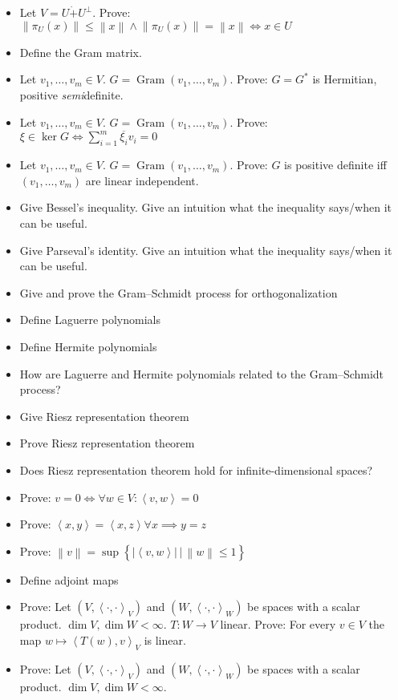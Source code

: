 \documentclass[a4paper]{article}
\newcommand{\setdef}[2]{\left\{\left.#1\,\right|\,#2\right\}}
\newcommand{\ip}[2]{\left\langle#1,#2\right\rangle} %
\newcommand{\norm}[1]{\left\|#1\right\|}
\newcommand{\card}[1]{\left|#1\right|}
\begin{document}
\begin{itemize}
  \item Let $V = U \dot+ U^{\bot}$. Prove: $\norm{\pi_U(x)} \leq \norm{x} \land \norm{\pi_U(x)} = \norm{x} \iff x \in U$
  \item Define the Gram matrix.
  \item Let $v_1, \ldots, v_m \in V$. $G = \operatorname{Gram}(v_1, \ldots, v_m)$. Prove: $G = G^*$ is Hermitian, positive \emph{semi}definite.
  \item Let $v_1, \ldots, v_m \in V$. $G = \operatorname{Gram}(v_1, \ldots, v_m)$. Prove: $\xi \in \ker{G} \iff \sum_{i=1}^m \overline{\xi_i} v_i = 0$
  \item Let $v_1, \ldots, v_m \in V$. $G = \operatorname{Gram}(v_1, \ldots, v_m)$. Prove: $G$ is positive definite iff $(v_1, \ldots, v_m)$ are linear independent.
  \item Give Bessel's inequality. Give an intuition what the inequality says/when it can be useful.
  \item Give Parseval's identity. Give an intuition what the inequality says/when it can be useful.
  \item Give and prove the Gram--Schmidt process for orthogonalization
  \item Define Laguerre polynomials
  \item Define Hermite polynomials
  \item How are Laguerre and Hermite polynomials related to the Gram--Schmidt process?
  \item Give Riesz representation theorem
  \item Prove Riesz representation theorem
  \item Does Riesz representation theorem hold for infinite-dimensional spaces?
  \item Prove: $v = 0 \iff \forall w \in V: \ip vw = 0$
  \item Prove: $\ip xy = \ip xz \forall x \implies y = z$
  \item Prove: $\norm{v} = \sup\setdef{\card{\ip vw}}{\norm{w} \leq 1}$
  \item Define adjoint maps
  \item Prove: Let $(V, \ip{\cdot}{\cdot}_V)$ and $(W, \ip{\cdot}{\cdot}_W)$ be spaces with a scalar product. $\dim{V}, \dim{W} < \infty$.
    $T: W \to V$ linear. Prove: For every $v \in V$ the map $w \mapsto \ip{T(w)}{v}_V$ is linear.
  \item Prove: Let $(V, \ip{\cdot}{\cdot}_V)$ and $(W, \ip{\cdot}{\cdot}_W)$ be spaces with a scalar product. $\dim{V}, \dim{W} < \infty$.

\end{itemize}
\end{document}
